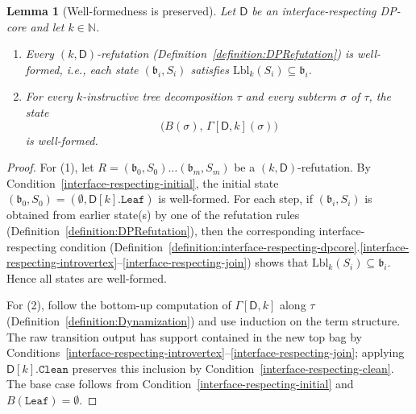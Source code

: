 \documentclass[11pt,a4paper]{article}
\newtheorem{lemma}[theorem]{Lemma}
\newcommand{\treewidthvalue}{k}
\newcommand{\N}{\mathbb{N}}
\newcommand{\abag}{\mathfrak{b}}
\newcommand{\leaftype}{\mathtt{Leaf}}
\newcommand{\initialsetgeneric}{\mathtt{Leaf}}
\newcommand{\cleaningfunctioncore}{\mathtt{Clean}}
\newcommand{\topbagname}{B}
\newcommand{\topbag}[1]{\topbagname(#1)}
\newcommand{\abstractdecomposition}{\tau}
\newcommand{\sigmaabstractdecomposition}{\sigma}
\newcommand{\dpcore}{\mathsf{D}}
\newcommand{\witnessset}{S}
\newcommand{\dynamizationfunctionname}[1]{\Gamma[{#1}]}
\newcommand{\dynamizationfunction}[2]{\dynamizationfunctionname{#1,#2}}
\newcommand{\dprefutation}{R}
\begin{document}
\begin{lemma}[Well-formedness is preserved]
\label{lemma:well-formedness-preserved}
Let $\dpcore$ be an interface-respecting DP-core and let $\treewidthvalue\in \N$.
\begin{enumerate}
\setlength\itemsep{0.25em}
\item Every $(\treewidthvalue,\dpcore)$-refutation (Definition~\ref{definition:DPRefutation}) is well-formed, i.e., each state $(\abag_i,\witnessset_i)$ satisfies $\mathrm{Lbl}_{\treewidthvalue}(\witnessset_i)\subseteq \abag_i$.
\item For every $\treewidthvalue$-instructive tree decomposition $\abstractdecomposition$ and every subterm $\sigmaabstractdecomposition$ of $\abstractdecomposition$, the state
\[
\bigl(\topbag{\sigmaabstractdecomposition},\,\dynamizationfunction{\dpcore}{\treewidthvalue}(\sigmaabstractdecomposition)\bigr)
\]
is well-formed.
\end{enumerate}
\end{lemma}
\begin{proof}
For (1), let $\dprefutation=(\abag_0,\witnessset_0)\dots(\abag_m,\witnessset_m)$ be a $(\treewidthvalue,\dpcore)$-refutation. By Condition~\ref{interface-respecting-initial}, the initial state $(\abag_0,\witnessset_0)=(\emptyset,\dpcore[\treewidthvalue].\initialsetgeneric)$ is well-formed. For each step, if $(\abag_i,\witnessset_i)$ is obtained from earlier state(s) by one of the refutation rules (Definition~\ref{definition:DPRefutation}), then the corresponding interface-respecting condition (Definition~\ref{definition:interface-respecting-dpcore}.\ref{interface-respecting-introvertex}--\ref{interface-respecting-join}) shows that $\mathrm{Lbl}_{\treewidthvalue}(\witnessset_i)\subseteq \abag_i$. Hence all states are well-formed.

	For (2), follow the bottom-up computation of $\dynamizationfunction{\dpcore}{\treewidthvalue}$ along $\abstractdecomposition$ (Definition~\ref{definition:Dynamization}) and use induction on the term structure. The raw transition output has support contained in the new top bag by Conditions~\ref{interface-respecting-introvertex}--\ref{interface-respecting-join}; applying $\dpcore[\treewidthvalue].\cleaningfunctioncore$ preserves this inclusion by Condition~\ref{interface-respecting-clean}. The base case follows from Condition~\ref{interface-respecting-initial} and $\topbag{\leaftype}=\emptyset$.
\end{proof}
\end{document}
